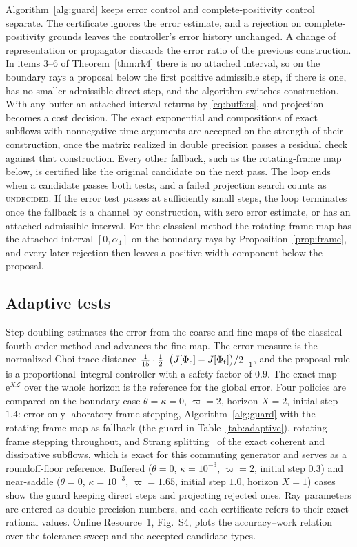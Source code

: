 \documentclass[pdflatex,sn-mathphys-num]{sn-jnl}
\newcommand{\e}{\mathrm{e}}
\newcommand{\Lgen}{\mathcal L}
\newcommand{\UNCERTAIN}{\textnormal{\textsc{undecided}}}
\theoremstyle{thmstyleone}
\theoremstyle{thmstylethree}
\theoremstyle{thmstyletwo}
\begin{document}
Algorithm~\ref{alg:guard} keeps error control and complete-positivity control separate. The certificate ignores the error estimate, and a rejection on complete-positivity grounds leaves the controller's error history unchanged. A change of representation or propagator discards the error ratio of the previous construction. In items 3--6 of Theorem~\ref{thm:rk4} there is no attached interval, so on the boundary rays a proposal below the first positive admissible step, if there is one, has no smaller admissible direct step, and the algorithm switches construction. With any buffer an attached interval returns by \eqref{eq:buffers}, and projection becomes a cost decision. The exact exponential and compositions of exact subflows with nonnegative time arguments are accepted on the strength of their construction, once the matrix realized in double precision passes a residual check against that construction. Every other fallback, such as the rotating-frame map below, is certified like the original candidate on the next pass. The loop ends when a candidate passes both tests, and a failed projection search counts as \UNCERTAIN. If the error test passes at sufficiently small steps, the loop terminates once the fallback is a channel by construction, with zero error estimate, or has an attached admissible interval. For the classical method the rotating-frame map has the attached interval $[0,\alpha_4]$ on the boundary rays by Proposition~\ref{prop:frame}, and every later rejection then leaves a positive-width component below the proposal.

\subsection{Adaptive tests}\label{sec:adaptive_tests}

Step doubling estimates the error from the coarse and fine maps of the classical fourth-order method and advances the fine map. The error measure is the normalized Choi trace distance $\tfrac1{15}\cdot\tfrac12\big\|\big(J[\Phi_{\rm c}]-J[\Phi_{\rm f}]\big)/2\big\|_1$, and the proposal rule is a proportional--integral controller with a safety factor of $0.9$. The exact map $\e^{X\Lgen}$ over the whole horizon is the reference for the global error. Four policies are compared on the boundary case $\theta=\kappa=0$, $\varpi=2$, horizon $X=2$, initial step $1.4$: error-only laboratory-frame stepping, Algorithm~\ref{alg:guard} with the rotating-frame map as fallback (the guard in Table~\ref{tab:adaptive}), rotating-frame stepping throughout, and Strang splitting~\cite{Strang1968} of the exact coherent and dissipative subflows, which is exact for this commuting generator and serves as a roundoff-floor reference. Buffered ($\theta=0$, $\kappa=10^{-3}$, $\varpi=2$, initial step $0.3$) and near-saddle ($\theta=0$, $\kappa=10^{-3}$, $\varpi=1.65$, initial step $1.0$, horizon $X=1$) cases show the guard keeping direct steps and projecting rejected ones. Ray parameters are entered as double-precision numbers, and each certificate refers to their exact rational values. Online Resource~1, Fig.~S4, plots the accuracy--work relation over the tolerance sweep and the accepted candidate types.
\end{document}

